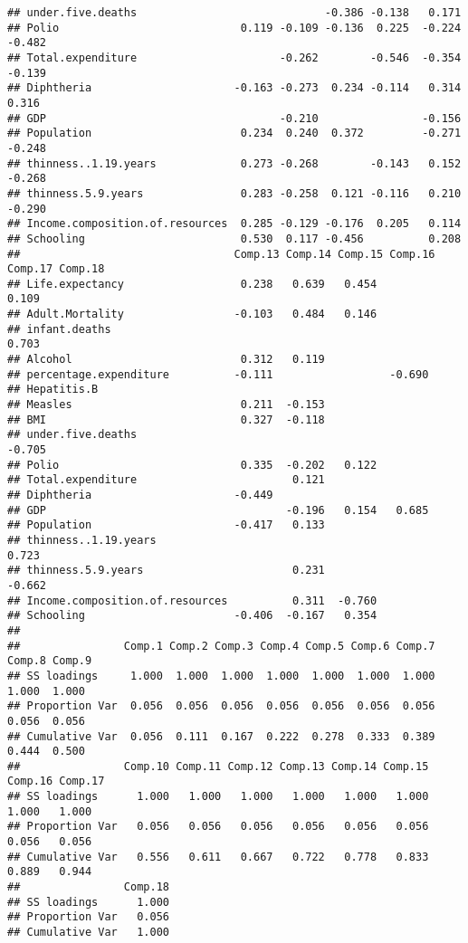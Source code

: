 \documentclass[
]{article}
\begin{document}
\begin{verbatim}
## under.five.deaths                             -0.386 -0.138   0.171         
## Polio                            0.119 -0.109 -0.136  0.225  -0.224  -0.482 
## Total.expenditure                      -0.262        -0.546  -0.354  -0.139 
## Diphtheria                      -0.163 -0.273  0.234 -0.114   0.314   0.316 
## GDP                                    -0.210                -0.156         
## Population                       0.234  0.240  0.372         -0.271  -0.248 
## thinness..1.19.years             0.273 -0.268        -0.143   0.152  -0.268 
## thinness.5.9.years               0.283 -0.258  0.121 -0.116   0.210  -0.290 
## Income.composition.of.resources  0.285 -0.129 -0.176  0.205   0.114         
## Schooling                        0.530  0.117 -0.456          0.208         
##                                 Comp.13 Comp.14 Comp.15 Comp.16 Comp.17 Comp.18
## Life.expectancy                  0.238   0.639   0.454           0.109         
## Adult.Mortality                 -0.103   0.484   0.146                         
## infant.deaths                                                            0.703 
## Alcohol                          0.312   0.119                                 
## percentage.expenditure          -0.111                  -0.690                 
## Hepatitis.B                                                                    
## Measles                          0.211  -0.153                                 
## BMI                              0.327  -0.118                                 
## under.five.deaths                                                       -0.705 
## Polio                            0.335  -0.202   0.122                         
## Total.expenditure                        0.121                                 
## Diphtheria                      -0.449                                         
## GDP                                     -0.196   0.154   0.685                 
## Population                      -0.417   0.133                                 
## thinness..1.19.years                                             0.723         
## thinness.5.9.years                       0.231                  -0.662         
## Income.composition.of.resources          0.311  -0.760                         
## Schooling                       -0.406  -0.167   0.354                         
## 
##                Comp.1 Comp.2 Comp.3 Comp.4 Comp.5 Comp.6 Comp.7 Comp.8 Comp.9
## SS loadings     1.000  1.000  1.000  1.000  1.000  1.000  1.000  1.000  1.000
## Proportion Var  0.056  0.056  0.056  0.056  0.056  0.056  0.056  0.056  0.056
## Cumulative Var  0.056  0.111  0.167  0.222  0.278  0.333  0.389  0.444  0.500
##                Comp.10 Comp.11 Comp.12 Comp.13 Comp.14 Comp.15 Comp.16 Comp.17
## SS loadings      1.000   1.000   1.000   1.000   1.000   1.000   1.000   1.000
## Proportion Var   0.056   0.056   0.056   0.056   0.056   0.056   0.056   0.056
## Cumulative Var   0.556   0.611   0.667   0.722   0.778   0.833   0.889   0.944
##                Comp.18
## SS loadings      1.000
## Proportion Var   0.056
## Cumulative Var   1.000
\end{verbatim}
\end{document}
